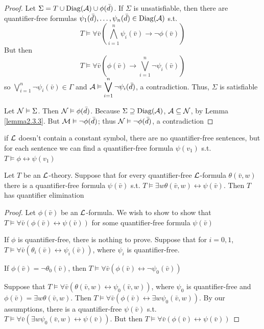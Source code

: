 \documentclass[11pt]{article}
\begin{document}
\begin{proof}
Let \(\Sigma=T\cup\operatorname{Diag}(\mathcal{A})\cup\phi(\bar{d})\). If \(\Sigma\) is unsatisfiable, then there are
quantifier-free formulas \(\psi_1(\bar{d}),\dots,\psi_n(\bar{d})\in\operatorname{Diag}(\mathcal{A})\) s.t.
\begin{equation*}
T\vDash\forall\bar{v}\left(
\displaystyle\bigwedge_{i=1}^n\psi_i(\bar{v})\to\neg\phi(\bar{v})
\right)
\end{equation*}
But then
\begin{equation*}
T\vDash\forall\bar{v}\left(\phi(\bar{v})\to
\displaystyle\bigvee_{i=1}^n\neg\psi_i(\bar{v})
\right)
\end{equation*}
so \(\displaystyle\bigvee_{i=1}^n\neg\psi_i(\bar{v})\in\Gamma\) and
\(\mathcal{A}\vDash\displaystyle\bigvee_{i=1}^n\neg\psi_i(\bar{d})\), a
contradiction. Thus, \(\Sigma\) is satisfiable

Let \(\mathcal{N}\vDash\Sigma\). Then \(\mathcal{N}\vDash\phi(\bar{d})\). Because
\(\Sigma\supseteq\operatorname{Diag}(\mathcal{A})\), \(\mathcal{A}\subseteq\mathcal{N}\), by Lemma \ref{lemma2.3.3}.
But \(\mathcal{M}\vDash\neg\phi(\bar{d})\); thus \(\mathcal{N}\vDash\neg\phi(\bar{d})\), a contradiction
\end{proof}

if \(\mathcal{L}\) doesn't contain a constant symbol, there are no quantifier-free sentences, but for each
sentence we can find a quantifier-free formula \(\psi(v_1)\) s.t. \(T\vDash\phi\leftrightarrow\psi(v_1)\)

\begin{lemma}[]
\label{lemma3.1.5}
Let \(T\) be an \(\mathcal{L}\)-theory. Suppose that for every quantifier-free
\(\mathcal{L}\)-formula \(\theta(\bar{v},w)\) there is a quantifier-free formula
\(\psi(\bar{v})\) s.t. \(T\vDash\exists w\theta(\bar{v},w)\leftrightarrow\psi(\bar{v})\). Then \(T\)
has quantifier elimination
\end{lemma}

\begin{proof}
Let \(\phi(\bar{v})\) be an \(\mathcal{L}\)-formula. We wish to show to show that
\(T\vDash\forall\bar{v}(\phi(\bar{v})\leftrightarrow\psi(\bar{v}))\) for some quantifier-free
formula \(\psi(\bar{v})\)

If \(\phi\) is quantifier-free, there is nothing to prove. Suppose that for
\(i=0,1\), \(T\vDash\forall\bar{v}(\theta_i(\bar{v})\leftrightarrow\psi_i(\bar{v}))\), where
\(\psi_{i}\) is quantifier-free.

If \(\phi(\bar{v})=\neg\theta_0(\bar{v})\), then
\(T\vDash\forall\bar{v}(\phi(\bar{v})\leftrightarrow\neg\psi_0(\bar{v}))\)

Suppose that \(T\vDash\forall\bar{v}(\theta(\bar{v},w)\leftrightarrow\psi_0(\bar{v},w))\), where
\(\psi_0\) is quantifier-free and \(\phi(\bar{v})=\exists w\theta(\bar{v},w)\). Then
\(T\vDash\forall\bar{v}(\phi(\bar{v})\leftrightarrow\exists w\psi_0(\bar{v},w))\). By our assumptions,
there is a quantifier-free \(\psi(\bar{v})\) s.t.
\(T\vDash\forall\bar{v}(\exists w\psi_0(\bar{v},w)\leftrightarrow\psi(\bar{v}))\). But then
\(T\vDash\forall\bar{v}(\phi(\bar{v})\leftrightarrow\psi(\bar{v}))\)
\end{proof}
\end{document}
